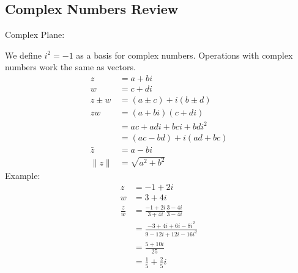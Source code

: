 \documentclass{math}
\begin{document}
\subsection*{Complex Numbers Review}
Complex Plane:
\begin{center}
\end{center}
We define \( i^2 = -1 \) as a basis for complex numbers. Operations with
complex numbers work the same as vectors.
\begin{align*}
  z &= a+bi \\
  w &= c+di \\
  z\pm w &= (a\pm c)+i(b\pm d) \\
  zw &= (a+bi)(c+di) \\
  &= ac+adi+bci+bdi^2 \\
  &= (ac-bd)+i(ad+bc) \\
  \bar{z} &= a-bi \\
  \|z\| &= \sqrt{a^2+b^2}
\end{align*}
Example:
\begin{align*}
  z &= -1+2i \\
  w &= 3+4i \\
  \frac{z}{w} &= \frac{-1+2i}{3+4i}\frac{3-4i}{3-4i} \\
  &= \frac{-3+4i+6i-8i^2}{9-12i+12i-16i^2} \\
  &= \frac{5+10i}{25} \\
  &= \frac{1}{5}+\frac{2}{5}i
\end{align*}
\end{document}
